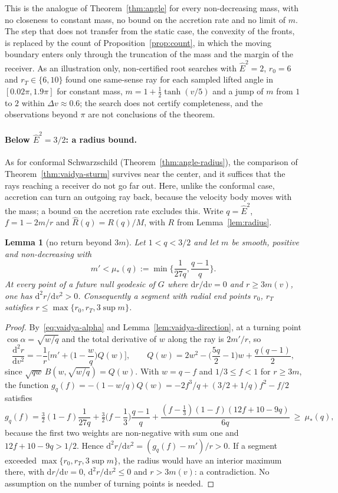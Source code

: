 \documentclass[aip,jmp,amsmath,amssymb,reprint]{revtex4-2}
\newcommand{\Ehat}{\hat E}
\newcommand{\dd}{\mathrm{d}}
\theoremstyle{plain}
\newtheorem{lemma}[proposition]{Lemma}
\theoremstyle{definition}
\begin{document}
This is the analogue of Theorem~\ref{thm:angle} for every non-decreasing mass, with no
closeness to constant mass, no bound on the accretion rate and no limit of $m$. The step that
does not transfer from the static case, the convexity of the fronts, is replaced by the
count of Proposition~\ref{prop:count}, in which the moving boundary enters only through the
truncation of the mass and the margin of the receiver. As an illustration only, non-certified root searches with $\Ehat^2=2$,
$r_0=6$ and $r_T\in\{6,10\}$ found one same-sense ray for each sampled lifted angle in
$[0.02\pi,1.9\pi]$ for constant mass, $m=1+\frac12\tanh(v/5)$ and a jump of $m$ from $1$ to $2$ within
$\Delta v\approx0.6$; the search does not certify completeness, and the observations beyond $\pi$
are not conclusions of the theorem.

\paragraph{Below $\Ehat^2=3/2$: a radius bound.} As for conformal Schwarzschild
(Theorem~\ref{thm:angle-radius}), the comparison of Theorem~\ref{thm:vaidya-sturm} survives near the center,
and it suffices that the rays reaching a receiver do not go far out. Here, unlike the conformal case,
accretion can turn an outgoing ray back, because the velocity body moves with the mass; a bound on the
accretion rate excludes this. Write $q=\Ehat^2$, $f=1-2m/r$ and $\widehat R(q)=R(q)/M$, with $R$ from
Lemma~\ref{lem:radius}.

\begin{lemma}[no return beyond $3m$]\label{lem:vaidya-no-return}
Let $1<q<3/2$ and let $m$ be smooth, positive and non-decreasing with
\[
  m'<\mu_*(q):=\min\Big\{\frac1{27q},\frac{q-1}q\Big\}.
\]
At every point of a future null geodesic of $G$ where $\dd r/\dd v=0$ and $r\ge3m(v)$, one has
$\dd^2r/\dd v^2>0$. Consequently a segment with radial end points $r_0$, $r_T$ satisfies
$r\le\max\{r_0,r_T,3\sup m\}$.
\end{lemma}

\begin{proof}
By~\eqref{eq:vaidya-alpha} and Lemma~\ref{lem:vaidya-direction}, at a turning point $\cos\alpha=\sqrt{w/q}$ and the
total derivative of $w$ along the ray is $2m'/r$, so
\[
  \frac{\dd^2r}{\dd v^2}=-\frac1r\Big[m'+\Big(1-\frac wq\Big)Q(w)\Big],\qquad
  Q(w)=2w^2-\Big(\frac{5q}2-1\Big)w+\frac{q(q-1)}2 ,
\]
since $\sqrt{qw}\,B(w,\sqrt{w/q})=Q(w)$. With $w=q-f$ and $1/3\le f<1$ for $r\ge3m$, the function
$g_q(f)=-(1-w/q)Q(w)=-2f^3/q+(3/2+1/q)f^2-f/2$ satisfies
\[
  g_q(f)=\tfrac32(1-f)\frac1{27q}+\tfrac32\Big(f-\frac13\Big)\frac{q-1}q
  +\frac{(f-\frac13)(1-f)(12f+10-9q)}{6q}\ \ge\ \mu_*(q),
\]
because the first two weights are non-negative with sum one and $12f+10-9q>1/2$. Hence
$\dd^2r/\dd v^2=(g_q(f)-m')/r>0$. If a segment exceeded $\max\{r_0,r_T,3\sup m\}$, the radius would have an
interior maximum there, with $\dd r/\dd v=0$, $\dd^2r/\dd v^2\le0$ and $r>3m(v)$: a contradiction. No
assumption on the number of turning points is needed.
\end{proof}
\end{document}
